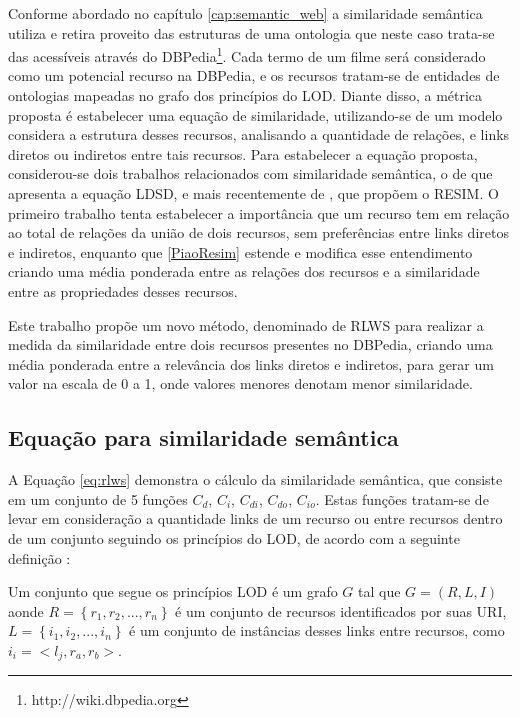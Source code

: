 Conforme abordado no capítulo \ref{cap:semantic_web} a similaridade semântica utiliza e retira proveito das estruturas de uma ontologia que neste caso trata-se das acessíveis através do DBPedia\footnote{http://wiki.dbpedia.org}. Cada termo de um filme será considerado como um potencial recurso na DBPedia, e os recursos tratam-se de entidades de ontologias mapeadas no grafo dos princípios do \ac{LOD}. Diante disso, a métrica proposta é estabelecer uma equação de similaridade, utilizando-se de um modelo considera a estrutura desses recursos, analisando a quantidade de relações, e links diretos ou indiretos entre tais recursos. Para estabelecer a equação proposta, considerou-se dois trabalhos relacionados com similaridade semântica, o de \cite{PassantLDSD} que apresenta a equação \ac{LDSD}, e mais recentemente de \cite{PiaoResim}, que propõem o \ac{RESIM}. O primeiro trabalho tenta estabelecer a importância que um recurso tem em relação ao total de relações da união de dois recursos, sem preferências entre links diretos e indiretos, enquanto que \ref{PiaoResim} estende e modifica esse entendimento criando uma média ponderada entre as relações dos recursos e a similaridade entre as propriedades desses recursos.

Este trabalho propõe um novo método, denominado de \ac{RLWS} para realizar a medida da similaridade entre dois recursos presentes no DBPedia, criando uma média ponderada entre a relevância dos links diretos e indiretos, para gerar um valor na escala de 0 a 1, onde valores menores denotam menor similaridade.

\subsection{Equação para similaridade semântica}
\label{ssec:formula_rlws}

A Equação \ref{eq:rlws} demonstra o cálculo da similaridade semântica, que consiste em um conjunto de 5 funções  $C_d$, $C_i$, $C_{di}$, $C_{do}$, $C_{io}$. Estas funções tratam-se de levar em consideração a quantidade links de um recurso ou entre recursos dentro de um conjunto seguindo os princípios do \ac{LOD}, de acordo com a seguinte definição \citep{PiaoResim}:

\begin{definition}
Um conjunto que segue os princípios LOD é um grafo $G$ tal que $G = (R, L, I)$ aonde $R = \left\{r_1, r_2, ..., r_n\right\}$ é um conjunto de recursos identificados por suas URI, $L = \left\{i_1, i_2, ..., i_n\right\}$ é um conjunto de instâncias desses links entre recursos, como $i_i = <l_j, r_a, r_b>$.
\end{definition}

